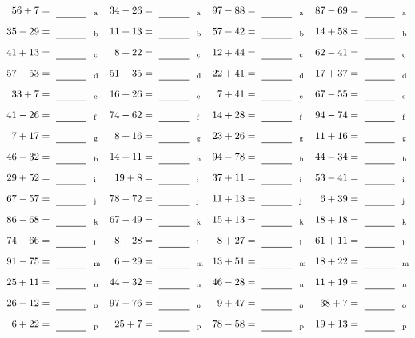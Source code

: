 \documentclass
[
  draft    = true,
  fontsize = 11pt,
  parskip  = half-
]
{scrartcl}
\begin{document}
\clearpage
\begin{align*}
    \pline{56+7}&=\rline{a}
  & \pline{34-26}&=\rline{a}
  & \pline{97-88}&=\rline{a}
  & \pline{87-69}&=\rline{a} \\[1ex]
    \pline{35-29}&=\rline{b}
  & \pline{11+13}&=\rline{b}
  & \pline{57-42}&=\rline{b}
  & \pline{14+58}&=\rline{b} \\[1ex]
    \pline{41+13}&=\rline{c}
  & \pline{8+22}&=\rline{c}
  & \pline{12+44}&=\rline{c}
  & \pline{62-41}&=\rline{c} \\[1ex]
    \pline{57-53}&=\rline{d}
  & \pline{51-35}&=\rline{d}
  & \pline{22+41}&=\rline{d}
  & \pline{17+37}&=\rline{d} \\[1ex]
    \pline{33+7}&=\rline{e}
  & \pline{16+26}&=\rline{e}
  & \pline{7+41}&=\rline{e}
  & \pline{67-55}&=\rline{e} \\[1ex]
    \pline{41-26}&=\rline{f}
  & \pline{74-62}&=\rline{f}
  & \pline{14+28}&=\rline{f}
  & \pline{94-74}&=\rline{f} \\[1ex]
    \pline{7+17}&=\rline{g}
  & \pline{8+16}&=\rline{g}
  & \pline{23+26}&=\rline{g}
  & \pline{11+16}&=\rline{g} \\[1ex]
    \pline{46-32}&=\rline{h}
  & \pline{14+11}&=\rline{h}
  & \pline{94-78}&=\rline{h}
  & \pline{44-34}&=\rline{h} \\[1ex]
    \pline{29+52}&=\rline{i}
  & \pline{19+8}&=\rline{i}
  & \pline{37+11}&=\rline{i}
  & \pline{53-41}&=\rline{i} \\[1ex]
    \pline{67-57}&=\rline{j}
  & \pline{78-72}&=\rline{j}
  & \pline{11+13}&=\rline{j}
  & \pline{6+39}&=\rline{j} \\[1ex]
    \pline{86-68}&=\rline{k}
  & \pline{67-49}&=\rline{k}
  & \pline{15+13}&=\rline{k}
  & \pline{18+18}&=\rline{k} \\[1ex]
    \pline{74-66}&=\rline{l}
  & \pline{8+28}&=\rline{l}
  & \pline{8+27}&=\rline{l}
  & \pline{61+11}&=\rline{l} \\[1ex]
    \pline{91-75}&=\rline{m}
  & \pline{6+29}&=\rline{m}
  & \pline{13+51}&=\rline{m}
  & \pline{18+22}&=\rline{m} \\[1ex]
    \pline{25+11}&=\rline{n}
  & \pline{44-32}&=\rline{n}
  & \pline{46-28}&=\rline{n}
  & \pline{11+19}&=\rline{n} \\[1ex]
    \pline{26-12}&=\rline{o}
  & \pline{97-76}&=\rline{o}
  & \pline{9+47}&=\rline{o}
  & \pline{38+7}&=\rline{o} \\[1ex]
    \pline{6+22}&=\rline{p}
  & \pline{25+7}&=\rline{p}
  & \pline{78-58}&=\rline{p}
  & \pline{19+13}&=\rline{p}
\end{align*}
\end{document}
